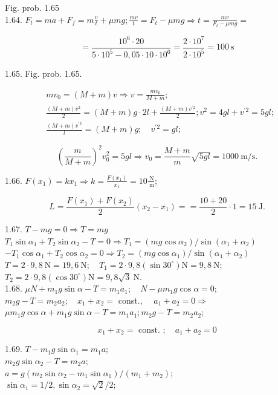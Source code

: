 \documentclass[10pt]{article}
\begin{document}
Fig. prob. 1.65\\
1.64. $F_{t}=m a+F_{f}=m \frac{v}{t}+\mu m g ; \frac{m v}{t}=F_{t}-\mu m g \Rightarrow t=\frac{m v}{F_{t}-\mu m g}=$

$$
=\frac{10^{6} \cdot 20}{5 \cdot 10^{5}-0,05 \cdot 10 \cdot 10^{6}}=\frac{2 \cdot 10^{7}}{2 \cdot 10^{5}}=100 \mathrm{~s}
$$

1.65. Fig. prob. 1.65.

$$
\begin{aligned}
& m v_{0}=(M+m) v \Rightarrow v=\frac{m v_{0}}{M+m} ; \\
& \frac{(M+m) v^{2}}{2}=(M+m) g \cdot 2 l+\frac{(M+m) v^{\prime 2}}{2} ; v^{2}=4 g l+v^{\prime 2}=5 g l ; \\
& \frac{(M+m) v^{\prime 2}}{l}=(M+m) g ; \quad v^{\prime 2}=g l ;
\end{aligned}
$$

$$
\left(\frac{m}{M+m}\right)^{2} v_{0}^{2}=5 g l \Rightarrow v_{0}=\frac{M+m}{m} \sqrt{5 g l}=1000 \mathrm{~m} / \mathrm{s} .
$$

1.66. $F\left(x_{1}\right)=k x_{1} \Rightarrow k=\frac{F\left(x_{1}\right)}{x_{1}}=10 \frac{\mathrm{~N}}{\mathrm{~m}}$;

$$
L=\frac{F\left(x_{1}\right)+F\left(x_{2}\right)}{2}\left(x_{2}-x_{1}\right)==\frac{10+20}{2} \cdot 1=15 \mathrm{~J} .
$$

1.67. $T-m g=0 \Rightarrow T=m g$\\
$T_{1} \sin \alpha_{1}+T_{2} \sin \alpha_{2}-T=0 \Rightarrow T_{1}=\left(m g \cos \alpha_{2}\right) / \sin \left(\alpha_{1}+\alpha_{2}\right)$\\
$-T_{1} \cos \alpha_{1}+T_{2} \cos \alpha_{2}=0 \Rightarrow T_{2}=\left(m g \cos \alpha_{1}\right) / \sin \left(\alpha_{1}+\alpha_{2}\right)$\\
$T=2 \cdot 9,8 \mathrm{~N}=19,6 \mathrm{~N} ; \quad T_{1}=2 \cdot 9,8\left(\sin 30^{\circ}\right) \mathrm{N}=9,8 \mathrm{~N}$; $T_{2}=2 \cdot 9,8\left(\cos 30^{\circ}\right) \mathrm{N}=9,8 \sqrt{3} \mathrm{~N}$.\\
1.68. $\mu N+m_{1} g \sin \alpha-T=m_{1} a_{1} ; \quad N-\mu m_{1} g \cos \alpha=0$;\\
$m_{2} g-T=m_{2} a_{2} ; \quad x_{1}+x_{2}=$ const., $\quad a_{1}+a_{2}=0 \Rightarrow$\\
$\mu m_{1} g \cos \alpha+m_{1} g \sin \alpha-T=m_{1} a_{1} ; m_{2} g-T=m_{2} a_{2}$;

$$
x_{1}+x_{2}=\text { const. } ; \quad a_{1}+a_{2}=0
$$

1.69. $T-m_{1} g \sin \alpha_{1}=m_{1} a$;\\
$m_{2} g \sin \alpha_{2}-T=m_{2} a$;\\
$a=g\left(m_{2} \sin \alpha_{2}-m_{1} \sin \alpha_{1}\right) /\left(m_{1}+m_{2}\right)$;\\
$\sin \alpha_{1}=1 / 2, \sin \alpha_{2}=\sqrt{2} / 2$;
\end{document}
